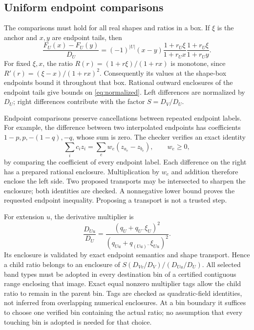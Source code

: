 \documentclass[11pt,a4paper]{article}
\begin{document}
\subsection{Uniform endpoint comparisons}
The comparisons must hold for all real shapes and ratios in a box.
If $\xi$ is the anchor and $x,y$ are endpoint tails, then
\begin{equation}\label{eq:normalized}
 \frac{F_U(x)-F_U(y)}{D_U}
 =(-1)^{|U|}(x-y)
    \frac{1+r_U\xi}{1+r_Ux}\frac{1+r_U\xi}{1+r_Uy}.
\end{equation}
For fixed $\xi,x$, the ratio
$R(r)=(1+r\xi)/(1+rx)$ is monotone, since
$R'(r)=(\xi-x)/(1+rx)^2$.
Consequently its values at the shape-box endpoints bound it throughout
that box. Rational outward enclosures of the endpoint tails give bounds
on \eqref{eq:normalized}. Left differences are normalized by $D_U$;
right differences contribute with the factor $S=D_V/D_U$.

Endpoint comparisons preserve cancellations between repeated endpoint
labels. For example, the difference between two interpolated endpoints
has coefficients $1-p,p,-(1-q),-q$, whose sum is zero.
The checker verifies an exact identity
\[
 \sum_i c_i z_i=\sum_e w_e(z_{a_e}-z_{b_e}),\qquad w_e\ge0,
\]
by comparing the coefficient of every endpoint label. Each difference
on the right has a prepared rational enclosure. Multiplication by
$w_e$ and addition therefore enclose the left side. Two proposed
transports may be intersected to sharpen the enclosure; both identities
are checked. A nonnegative lower bound proves the requested endpoint
inequality. Proposing a transport is not a trusted step.

For extension $u$, the derivative multiplier is
\[
 \frac{D_{Uu}}{D_U}
 =\frac{(q_U+q_{U^-}\xi_U)^2}
        {(q_{Uu}+q_{(Uu)^-}\xi_{Uu})^2}.
\]
Its enclosure is validated by exact endpoint semantics and shape
transport. Hence a child ratio belongs to an enclosure of
$S(D_{Vv}/D_V)/(D_{Uu}/D_U)$. All selected band types must be adopted
in every destination bin of a certified contiguous range enclosing
that image. Exact equal nonzero multiplier tags allow the child ratio
to remain in the parent bin. Tags are checked as quadratic-field
identities, not inferred from overlapping numerical enclosures.
At a bin boundary it suffices to choose one verified bin containing
the actual ratio; no assumption that every touching bin is adopted
is needed for that choice.
\end{document}
